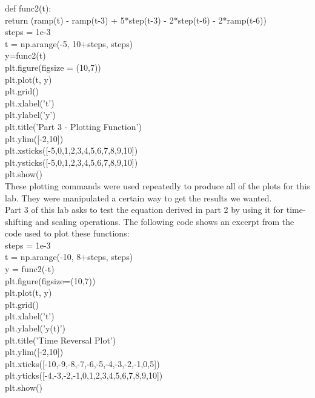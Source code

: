 \documentclass[12pt]{report}
\begin{document}
\indent def func2(t):\\
    \indent\indent return (ramp(t) - ramp(t-3) + 5*step(t-3) - 2*step(t-6) - 2*ramp(t-6))\\

\indent steps = 1e-3\\
\indent t = np.arange(-5, 10+steps, steps)\\
\indent y=func2(t)\\

\indent plt.figure(figsize = (10,7))\\
\indent plt.plot(t, y)\\
\indent plt.grid()\\
\indent plt.xlabel('t')\\
\indent plt.ylabel('y')\\
\indent plt.title('Part 3 - Plotting Function')\\
\indent plt.ylim([-2,10])\\
\indent plt.xsticks([-5,0,1,2,3,4,5,6,7,8,9,10])\\
\indent plt.ysticks([-5,0,1,2,3,4,5,6,7,8,9,10])\\
\indent plt.show()\\

\noindent These plotting commands were used repeatedly to produce all of the plots for this lab. They were manipulated a certain way to get the results we wanted. \\

\noindent Part 3 of this lab asks to test the equation derived in part 2 by using it for time-shifting and scaling operations. The following code shows an excerpt from the code used to plot these functions: \\

 steps = 1e-3\\
\indent t = np.arange(-10, 8+steps, steps)\\
\indent y = func2(-t)\\

\indent plt.figure(figsize=(10,7))\\
\indent plt.plot(t, y)\\
\indent plt.grid()\\
\indent plt.xlabel('t')\\
\indent plt.ylabel('y(t)')\\
\indent plt.title('Time Reversal Plot')\\
\indent plt.ylim([-2,10])\\
\indent plt.xticks([-10,-9,-8,-7,-6,-5,-4,-3,-2,-1,0,5])\\
\indent plt.yticks([-4,-3,-2,-1,0,1,2,3,4,5,6,7,8,9,10])\\
\indent plt.show()\\
\end{document}
